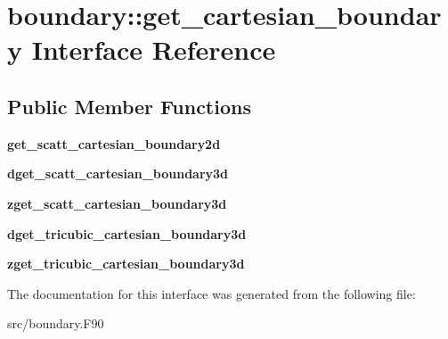 \hypertarget{interfaceboundary_1_1get__cartesian__boundary}{}\section{boundary\+:\+:get\+\_\+cartesian\+\_\+boundary Interface Reference}
\label{interfaceboundary_1_1get__cartesian__boundary}
\subsection*{Public Member Functions}
\begin{DoxyCompactItemize}
\item 
\mbox{\label{interfaceboundary_1_1get__cartesian__boundary_a50e34f982c6597bc6bdfcdaa37debff7}} 
{\bfseries get\+\_\+scatt\+\_\+cartesian\+\_\+boundary2d}
\item 
\mbox{\label{interfaceboundary_1_1get__cartesian__boundary_a2de9c58d2e4e727aff088dc9af8458d8}} 
{\bfseries dget\+\_\+scatt\+\_\+cartesian\+\_\+boundary3d}
\item 
\mbox{\label{interfaceboundary_1_1get__cartesian__boundary_a2e4acc867d9ec5da65fb4604ba666892}} 
{\bfseries zget\+\_\+scatt\+\_\+cartesian\+\_\+boundary3d}
\item 
\mbox{\label{interfaceboundary_1_1get__cartesian__boundary_adc6d7a6fddbb5f79230cc80d82c3284e}} 
{\bfseries dget\+\_\+tricubic\+\_\+cartesian\+\_\+boundary3d}
\item 
\mbox{\label{interfaceboundary_1_1get__cartesian__boundary_a9ff04ccc9b57816fbbd95858c3926ff5}} 
{\bfseries zget\+\_\+tricubic\+\_\+cartesian\+\_\+boundary3d}
\end{DoxyCompactItemize}


The documentation for this interface was generated from the following file\+:\begin{DoxyCompactItemize}
\item 
src/boundary.\+F90\end{DoxyCompactItemize}
